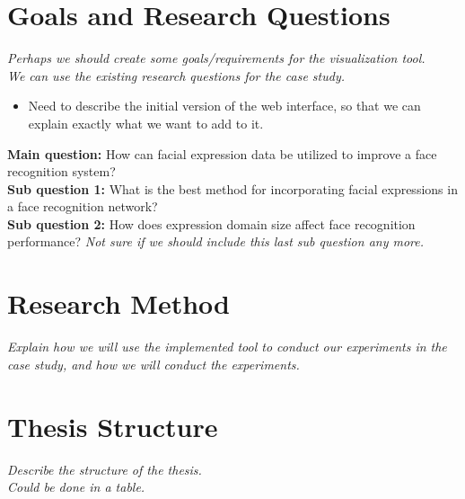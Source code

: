 \section{Goals and Research Questions}

\textit{Perhaps we should create some goals/requirements for the visualization tool. \\
We can use the existing research questions for the case study.}

\begin{itemize}
    \item Need to describe the initial version of the web interface, so that we can explain exactly what we want to add to it.
\end{itemize}

\noindent\textbf{Main question:} How can facial expression data be utilized to improve a face recognition system? \\
\textbf{Sub question 1:} What is the best method for incorporating facial expressions in a face recognition network? \\
\textbf{Sub question 2:} How does expression domain size affect face recognition performance? \textit{Not sure if we should include this last sub question any more.}

\section{Research Method}

\textit{Explain how we will use the implemented tool to conduct our experiments in the case study, and how we will conduct the experiments.}

\section{Thesis Structure}

\textit{Describe the structure of the thesis. \\
Could be done in a table.}

